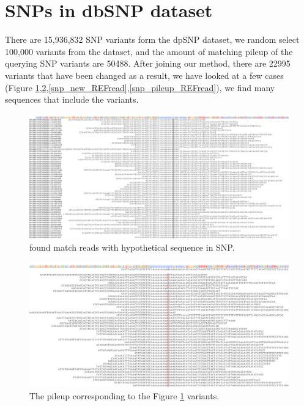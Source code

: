 \section{SNPs in dbSNP dataset}

There are 15,936,832 SNP variants form the dpSNP dataset, we random select 100,000 variants from the dataset, and the amount of matching pileup of the querying SNP variants are 50488. After joining our method, there are 22995 variants that have been changed as a result, we have looked at a few cases (Figure \ref{snp_new_ALTread},\ref{snp_pileup_ALTread},\ref{snp_new_REFread},\ref{snp_pileup_REFread}), we find many sequences that include the variants.


\begin{figure}[H]
\centering
\includegraphics[width=1\columnwidth]{body/image/snp_new_ALTread.png}
\caption[SNP match reads]{ found match reads with hypothetical sequence in SNP.}
\label{snp_new_ALTread}
\end{figure}

\begin{figure}[H]
\centering
\includegraphics[width=1\columnwidth]{body/image/snp_pileup_ALTread.png}
\caption[Figure 4.17 pileup]{ The pileup corresponding to the Figure \ref{snp_new_ALTread} variants.}
\label{snp_pileup_ALTread}
\end{figure}

